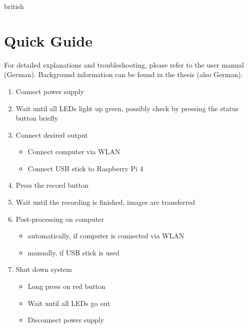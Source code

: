 \documentclass[./00PhotoBox.tex]{subfiles}
\begin{document}
\begin{otherlanguage*}{british}

    \chapter{Quick Guide}

    For detailed explanations and troubleshooting, please refer to the user manual (German). Background information can be found in the thesis (also German).

    \begin{enumerate}
        \item Connect power supply
        \item Wait until all LEDs light up green, possibly check by pressing the status button briefly
        \item Connect desired output
              \begin{itemize}
                  \item Connect computer via WLAN
                  \item Connect USB stick to Raspberry Pi 4
              \end{itemize}
        \item Press the record button
        \item Wait until the recording is finished, images are transferred
        \item Post-processing on computer
              \begin{itemize}
                  \item automatically, if computer is connected via WLAN
                  \item manually, if USB stick is used
              \end{itemize}
        \item Shut down system
              \begin{itemize}
                  \item Long press on red button
                  \item Wait until all LEDs go out
                  \item Disconnect power supply
              \end{itemize}
    \end{enumerate}

\end{otherlanguage*}
\end{document}
